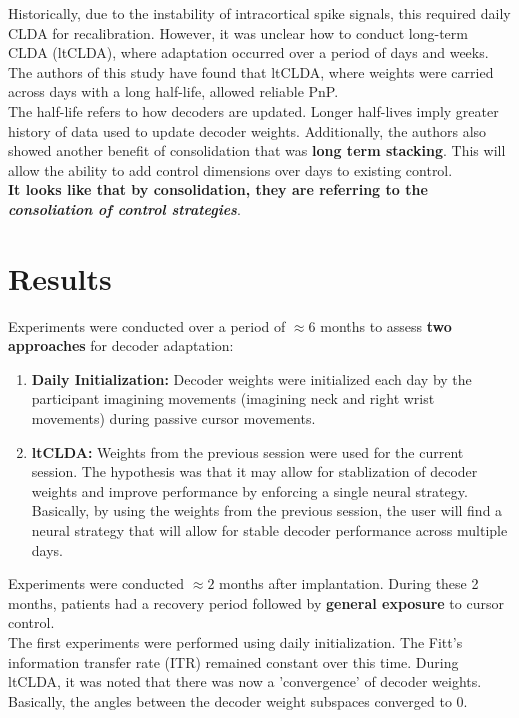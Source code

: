\documentclass[11pt, a4paper, openany]{report}
\theoremstyle{definition}
\theoremstyle{remark}
\begin{document}
Historically, due to the instability of intracortical spike signals, this required daily CLDA for recalibration. However, it was unclear how to conduct long-term CLDA (ltCLDA), where adaptation occurred over a period of days and weeks. The authors of this study have found that ltCLDA, where weights were carried across days with a long half-life, allowed reliable PnP.\\

The half-life refers to how decoders are updated. Longer half-lives imply greater history of data used to update decoder weights. Additionally, the authors also showed another benefit of consolidation that was \textbf{long term stacking}.
This will allow the ability to add control dimensions over days to existing control.\\

\textbf{It looks like that by consolidation, they are referring to the \textit{consoliation of control strategies}}.

\section{Results}
Experiments were conducted over a period of \( \approx 6 \) months to assess \textbf{two approaches} for decoder adaptation:
\begin{enumerate}
    \item \textbf{Daily Initialization:} Decoder weights were initialized each day by the participant imagining movements (imagining neck and right wrist movements) during passive cursor movements.
    \item \textbf{ltCLDA:} Weights from the previous session were used for the current session. The hypothesis was that it may allow for stablization of decoder weights and improve performance by enforcing a single neural strategy. Basically, by using the weights from the previous session, the user will find a neural strategy that will allow for stable decoder performance across multiple days. 
\end{enumerate}

Experiments were conducted \( \approx 2 \) months after implantation. During these 2 months, patients had a recovery period followed by \textbf{general exposure} to cursor control. \\

The first experiments were performed using daily initialization. The Fitt's information transfer rate (ITR) remained constant over this time. During ltCLDA, it was noted that there was now a 'convergence' of decoder weights. Basically, the angles between the decoder weight subspaces converged to 0.\\
\end{document}
